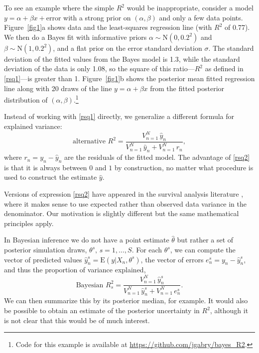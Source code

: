 \documentclass[11pt]{article}
\begin{document}
To see an example where the simple $R^2$ would be inappropriate, consider a model
$y = \alpha + \beta x+\mbox{error}$
with a strong prior on $(\alpha,\beta)$ and only a few data points.
Figure~\ref{fig1}a shows data and the least-squares regression line (with
$R^2$ of 0.77).  We then do a Bayes fit with informative priors
$\alpha \sim \mbox{N}(0,0.2^2)$ and $\beta \sim \mbox{N}(1,0.2^2)$, and 
a flat prior on the error standard deviation $\sigma$. 
The standard deviation of the fitted values from the Bayes model is 1.3, while
the standard deviation of the data is only 1.08, so the square of this
ratio---$R^2$ as defined in \eqref{rsq1}---is greater than 1.
Figure~\ref{fig1}b shows the posterior mean fitted regression line along
with 20 draws of the line $y = \alpha + \beta x$ from the fitted posterior
distribution of $(\alpha,\beta)$.\footnote{Code for this example is available at
\url{https://github.com/jgabry/bayes_R2}.}

Instead of working with \eqref{rsq1} directly, we generalize a different formula
for explained variance:
%
\begin{equation}\label{rsq2}
\mbox{alternative } R^2 = 
	\frac{V_{n=1}^N \,\hat{y}_n}{V_{n=1}^N \,\hat{y}_n  + V_{n=1}^N \,r_n},
\end{equation}
%
where $r_n = y_n - \hat{y}_n$ are the residuals of the fitted model.
The advantage of \eqref{rsq2} is that it is always between $0$ and $1$ by
construction, no matter what procedure is used to construct the estimate
$\hat{y}$.

Versions of expression \eqref{rsq2} have appeared in the survival analysis
literature \citep{KentOquigley1988, ChoodariRoystonParmar2010},
where it makes sense to use expected rather than observed data variance
in the denominator.  Our motivation is slightly different but the same
mathematical principles apply.

In Bayesian inference we do not have a point estimate $\hat{\theta}$ but rather
a set of posterior simulation draws, $\theta^s, \,s=1,\ldots,S$.
For each $\theta^s$, we can compute the vector of predicted values
$\hat{y}_n^s = \mbox{E}(y | X_n, \theta^s)$, the vector of errors
$e_n^s = y_n - \hat{y}_n^s$, and thus the proportion of variance explained,
%
\begin{equation}\label{rsq3}
\mbox{Bayesian } R^2_s = 
	\frac{V_{n=1}^N \,\hat{y}_n^s}{V_{n=1}^N \,\hat{y}_n^s  + V_{n=1}^N \,e_n^s}.
\end{equation}
%
We can then summarize this by its posterior median, for example. It would also
be possible to obtain an estimate of the posterior uncertainty in $R^2$,
although it is not clear that this would be of much interest.
\end{document}
